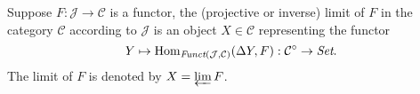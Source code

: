 \documentclass[9pt]{extarticle}
\newcommand{\cc}{\mathcal{C}}
\begin{document}
\pro
	Suppose $F:\mathcal{J}\to \cc$ is a functor, the (projective or inverse) limit of $F$ in the category $\cc$ according to $\mathcal{J}$ is an object $X\in\cc$ representing the functor
	\[
		Y\mapsto \Hom_{\textit{Funct}(\mathcal{J},\cc)}(\Delta Y,F):\cc^\circ\to \textit{Set}.
	\]
	The limit of $F$ is denoted by $X=\varprojlim F$.
\end{document}
